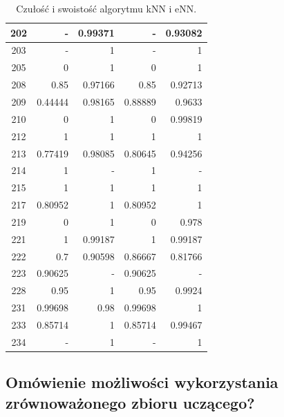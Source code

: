 \begin{table}[H]
\begin{tabular}{|c|r|r|r|r|}
\hline                                   
202 &- &0.99371 &- &0.93082\\        
\hline                                   
203 &- &1 &- &1\\                    
\hline                                   
205 &0 &1 &0 &1\\                        
\hline                                   
208 &0.85 &0.97166 &0.85 &0.92713\\      
\hline                                   
209 &0.44444 &0.98165 &0.88889 &0.9633\\ 
\hline                                   
210 &0 &1 &0 &0.99819\\                  
\hline                                   
212 &1 &1 &1 &1\\                        
\hline                                   
213 &0.77419 &0.98085 &0.80645 &0.94256\\
\hline                                   
214 &1 &- &1 &-\\                    
\hline                                   
215 &1 &1 &1 &1\\                        
\hline                                   
217 &0.80952 &1 &0.80952 &1\\            
\hline                                   
219 &0 &1 &0 &0.978\\                    
\hline                                   
221 &1 &0.99187 &1 &0.99187\\            
\hline                                   
222 &0.7 &0.90598 &0.86667 &0.81766\\    
\hline                                   
223 &0.90625 &- &0.90625 &-\\        
\hline                                   
228 &0.95 &1 &0.95 &0.9924\\             
\hline                                   
231 &0.99698 &0.98 &0.99698 &1\\         
\hline                                   
233 &0.85714 &1 &0.85714 &0.99467\\      
\hline                                   
234 &- &1 &- &1\\                    
\hline                                   
	\end{tabular}
	\caption{Czułość i swoistość algorytmu kNN i eNN.}
	\label{tab:matlab-wskazniki}
\end{table}
\subsection{Omówienie możliwości wykorzystania zrównoważonego zbioru uczącego?}

